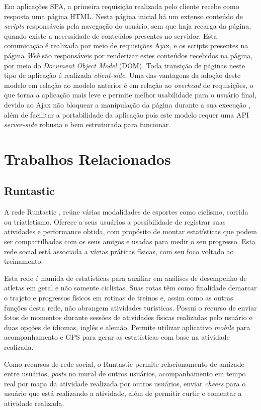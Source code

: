 Em aplicações SPA, a primeira requisição realizada pelo cliente recebe como resposta uma página HTML. 
Nesta página inicial há um extenso conteúdo de
\textit{scripts} responsáveis pela navegação do usuário, sem que haja recarga da página, quando existe a 
necessidade de conteúdos presentes no servidor. 
Esta comunicação é realizada por meio de requisições Ajax, e os scripts presentes na página \textit{Web}
são responsáveis por renderizar estes conteúdos recebidos na
página, por meio do \textit{Document Object Model} (DOM). Toda transição de páginas neste tipo de aplicação é 
realizada \textit{client-side}. 
Uma das vantagens da adoção deste modelo em relação ao modelo anterior é em relação ao \textit{overhead} de requisições, o que torna a aplicação 
mais leve e permite melhor usabilidade para o usuário final, devido ao Ajax não bloquear a manipulação da página durante a sua 
execução \cite{spa01}, 
além de facilitar a portabilidade da aplicação pois este modelo requer uma API \textit{server-side} robusta e bem estruturada para funcionar.

\section{\esp Trabalhos Relacionados}
\subsection{Runtastic}
A rede Runtastic \cite{runtastic}, reúne várias modalidades de esportes como ciclismo, corrida ou triatletismo. Oferece a seus usuários a
possibilidade de registrar suas atividades e performance obtida, com propósito de montar estatísticas que podem ser compartilhadas com 
os seus amigos e
usadas para medir o seu progresso. Esta rede social está associada a várias práticas físicas, com seu foco voltado ao treinamento. 

Esta rede é munida de estatísticas para auxiliar em análises de desempenho de atletas em geral e não 
somente ciclistas. Suas rotas têm como finalidade 
demarcar o trajeto e progressos físicos em rotinas de treinos e, assim como as outras funções desta rede, 
não abrangem atividades turísticas. Possui o 
recurso de enviar fotos de momentos durante sessões de atividades físicas realizadas pelo usuário e duas opções de idiomas, inglês e alemão. Permite 
utilizar aplicativo \textit{mobile} para acompanhamento e GPS para gerar as estatísticas com base na atividade realizada. 

Como recursos de rede social, o Runtastic permite relacionamento de amizade entre usuários, \textit{posts} no mural de outros usuários, 
acompanhamento em tempo real por mapa da atividade realizada por outros usuários, enviar \textit{cheers} para o usuário que está 
realizando a atividade, além de permitir curtir e comentar a atividade realizada. 

